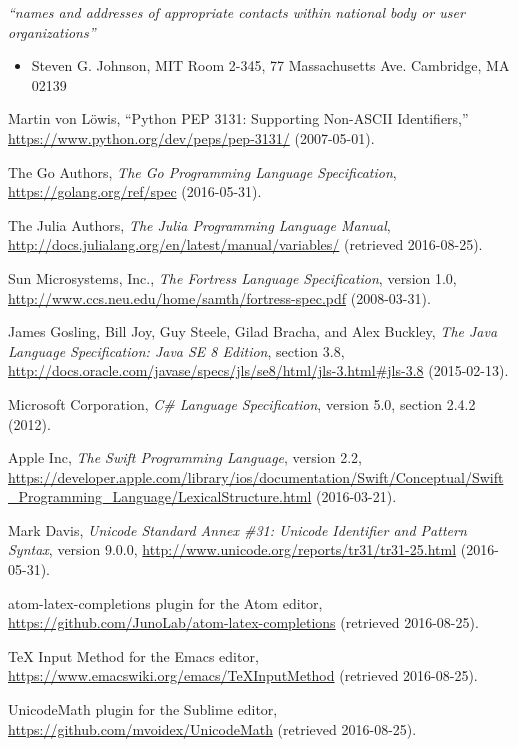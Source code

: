 \documentclass[10pt,english]{article}
\begin{document}
\emph{``names and addresses of appropriate contacts
within national body or user organizations''}
\begin{itemize}
\item Steven G. Johnson, MIT Room 2-345, 77 Massachusetts Ave. Cambridge,
MA 02139\end{itemize}
\begin{thebibliography}{10}
Martin von L{\"o}wis, ``Python PEP 3131:
Supporting Non-ASCII Identifiers,'' \url{https://www.python.org/dev/peps/pep-3131/}
(2007-05-01).

The Go Authors, \emph{The Go Programming Language Specification},
\url{https://golang.org/ref/spec} (2016-05-31).

The Julia Authors, \emph{The Julia Programming Language
Manual}, \url{http://docs.julialang.org/en/latest/manual/variables/}
(retrieved 2016-08-25).

Sun Microsystems, Inc., \emph{The Fortress Language
Specification}, version 1.0, \url{http://www.ccs.neu.edu/home/samth/fortress-spec.pdf}
(2008-03-31).

James Gosling, Bill Joy, Guy Steele, Gilad Bracha,
and Alex Buckley, \emph{The Java Language Specification: Java SE 8
Edition}, section 3.8, \url{http://docs.oracle.com/javase/specs/jls/se8/html/jls-3.html\#jls-3.8}
(2015-02-13).

Microsoft Corporation, \emph{C\# Language Specification},
version 5.0, section 2.4.2 (2012).

Apple Inc, \emph{The Swift Programming Language},
version 2.2, \url{https://developer.apple.com/library/ios/documentation/Swift/Conceptual/Swift_Programming_Language/LexicalStructure.html}
(2016-03-21).

Mark Davis, \emph{Unicode Standard Annex \#31: Unicode
Identifier and Pattern Syntax}, version 9.0.0, \url{http://www.unicode.org/reports/tr31/tr31-25.html}
(2016-05-31).

atom-latex-completions plugin for the Atom editor,
\url{https://github.com/JunoLab/atom-latex-completions}
(retrieved 2016-08-25).

\TeX{} Input Method for the Emacs editor, \url{https://www.emacswiki.org/emacs/TeXInputMethod}
(retrieved 2016-08-25).

UnicodeMath plugin for the Sublime editor, \url{https://github.com/mvoidex/UnicodeMath}
(retrieved 2016-08-25).


\end{thebibliography}
\end{document}

